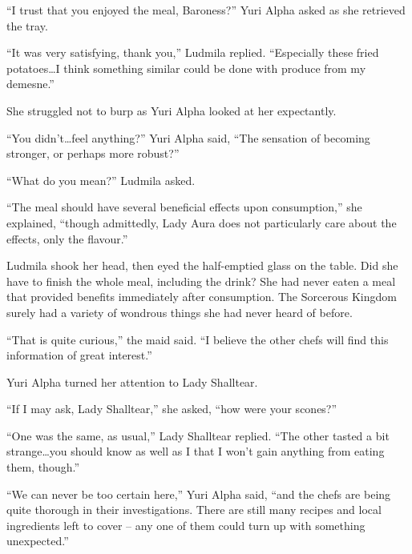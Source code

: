  

“I trust that you enjoyed the meal, Baroness?” Yuri Alpha asked as she retrieved the tray.

 

“It was very satisfying, thank you,” Ludmila replied. “Especially these fried potatoes…I think something similar could be done with produce from my demesne.”

 

She struggled not to burp as Yuri Alpha looked at her expectantly.

 

“You didn’t…feel anything?” Yuri Alpha said, “The sensation of becoming stronger, or perhaps more robust?”

 

“What do you mean?” Ludmila asked.

 

“The meal should have several beneficial effects upon consumption,” she explained, “though admittedly, Lady Aura does not particularly care about the effects, only the flavour.”

 

Ludmila shook her head, then eyed the half-emptied glass on the table. Did she have to finish the whole meal, including the drink? She had never eaten a meal that provided benefits immediately after consumption. The Sorcerous Kingdom surely had a variety of wondrous things she had never heard of before.

 

“That is quite curious,” the maid said. “I believe the other chefs will find this information of great interest.”

 

Yuri Alpha turned her attention to Lady Shalltear.

 

“If I may ask, Lady Shalltear,” she asked, “how were your scones?”

 

“One was the same, as usual,” Lady Shalltear replied. “The other tasted a bit strange…you should know as well as I that I won’t gain anything from eating them, though.”

 

“We can never be too certain here,” Yuri Alpha said, “and the chefs are being quite thorough in their investigations. There are still many recipes and local ingredients left to cover – any one of them could turn up with something unexpected.”

 

